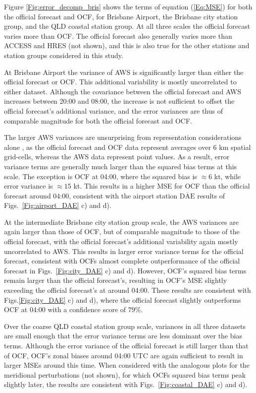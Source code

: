 \documentclass{ametsoc}
\begin{document}
Figure \ref{Fig:error_decomp_bris} shows the terms of equation (\ref{Eq:MSE}) for both the official forecast and OCF, for Brisbane Airport, the Brisbane city station group, and the QLD coastal station group. At all three scales the official forecast varies more than OCF. The official forecast also generally varies more than ACCESS and HRES (not shown), and this is also true for the other stations and station groups considered in this study. 

At Brisbane Airport the variance of AWS is significantly larger than either the official forecast or OCF. This additional variability is mostly uncorrelated to either dataset. Although the covariance between the official forecast and AWS increases between 20:00 and 08:00, the increase is not sufficient to offset the official forecast's additional variance, and the error variances are thus of comparable magnitude for both the official forecast and OCF. 

The larger AWS variances are unsurprising from representation considerations alone \citep[e.g.][]{zaron06}, as the official forecast and OCF data represent averages over 6 km spatial grid-cells, whereas the AWS data represent point values. As a result, error variance terms are generally much larger than the squared bias terms at this scale. The exception is OCF at 04:00, where the squared bias is $\approx 6$ kt, while error variance is $\approx 15$ kt. This results in a higher MSE for OCF than the official forecast around 04:00, consistent with the airport station $\overline{\text{DAE}}$ results of Figs.~\ref{Fig:airport_DAE} c) and d).

At the intermediate Brisbane city station group scale, the AWS variances are again larger than those of OCF, but of comparable magnitude to those of the official forecast, with the official forecast's additional variability again mostly uncorrelated to AWS. This results in larger error variance terms for the official forecast, consistent with OCFs almost complete outperformance of the official forecast in Figs.~\ref{Fig:city_DAE} c) and d). However, OCF's squared bias terms remain larger than the official forecast's, resulting in OCF's MSE slightly exceeding the official forecast's at around 04:00. These results are consistent with Figs.\ref{Fig:city_DAE} c) and d), where the official forecast slightly outperforms OCF at 04:00 with a confidence score of $79\%$.  

Over the coarse QLD coastal station group scale, variances in all three datasets are small enough that the error variance terms are less dominant over the bias terms. Although the error variance of the official forecast is still larger than that of OCF, OCF's zonal biases around 04:00 UTC are again sufficient to result in larger MSEs around this time. When considered with the analogous plots for the meridional perturbations (not shown), for which OCFs squared bias terms peak slightly later, the results are consistent with Figs.~\ref{Fig:coastal_DAE} c) and d).
\end{document}

